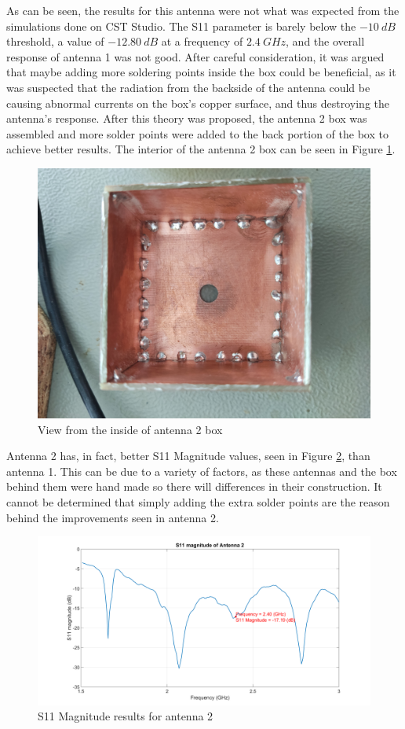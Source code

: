 \par As can be seen, the results for this antenna were not what was expected from the simulations done on CST Studio. The S11 parameter is barely below the $-10 \:\si{dB}$ threshold, a value of $-12.80\:\si{dB}$ at a frequency of $2.4\:\si{GHz}$, and the overall response of antenna 1 was not good. After careful consideration, it was argued that maybe adding more soldering points inside the box could be beneficial, as it was suspected that the radiation from the backside of the antenna could be causing abnormal currents on the box's copper surface, and thus destroying the antenna's response. After this theory was proposed, the antenna 2 box was assembled and more solder points were added to the back portion of the box to achieve better results. The interior of the antenna 2 box can be seen in Figure \ref{fig:ch3_antenna2Box.jpg}.

\begin{figure}[H]
    \vspace*{0cm}
    \centering
    \includegraphics[width=0.3\linewidth]{figs/ch3_antenna2Box.jpg}
    \caption{View from the inside of antenna 2 box}
    \label{fig:ch3_antenna2Box.jpg}
\end{figure}

\par Antenna 2 has, in fact, better S11 Magnitude values, seen in Figure \ref{fig:ch3_s11magAnt2.png}, than antenna 1. This can be due to a variety of factors, as these antennas and the box behind them were hand made so there will differences in their construction. It cannot be determined that simply adding the extra solder points are the reason behind the improvements seen in antenna 2.

\begin{figure}[H]
    \vspace*{0cm}
    \centering
    \includegraphics[width=1\linewidth]{figs/ch3_s11magAnt2.png}
    \caption{S11 Magnitude results for antenna 2}
    \label{fig:ch3_s11magAnt2.png}
\end{figure}

